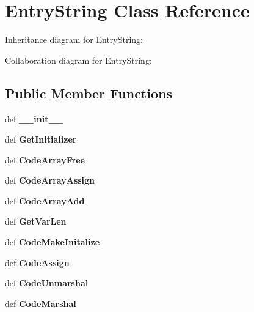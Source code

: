 \section{\-Entry\-String \-Class \-Reference}
\label{classevent__rpcgen_1_1_entry_string}


\-Inheritance diagram for \-Entry\-String\-:


\-Collaboration diagram for \-Entry\-String\-:
\subsection*{\-Public \-Member \-Functions}
\begin{DoxyCompactItemize}
\item 
def {\bfseries \-\_\-\-\_\-init\-\_\-\-\_\-}\label{classevent__rpcgen_1_1_entry_string_ac775ee34451fdfa742b318538164070e}

\item 
def {\bfseries \-Get\-Initializer}\label{classevent__rpcgen_1_1_entry_string_acc967744885bfbdf0f0aeed27c888d23}

\item 
def {\bfseries \-Code\-Array\-Free}\label{classevent__rpcgen_1_1_entry_string_a6041961df8fdc24bd66777ade5b196c5}

\item 
def {\bfseries \-Code\-Array\-Assign}\label{classevent__rpcgen_1_1_entry_string_a4a82db0bf599d23f74a63843f450cea5}

\item 
def {\bfseries \-Code\-Array\-Add}\label{classevent__rpcgen_1_1_entry_string_a1f454357f69d9ec15f1a68c95d0e0326}

\item 
def {\bfseries \-Get\-Var\-Len}\label{classevent__rpcgen_1_1_entry_string_a08d14096a163fb84ee8c3536eab2ff47}

\item 
def {\bfseries \-Code\-Make\-Initalize}\label{classevent__rpcgen_1_1_entry_string_a9a84eb92a91dbaaefcf99c0adea32bfb}

\item 
def {\bfseries \-Code\-Assign}\label{classevent__rpcgen_1_1_entry_string_a6b6a08cd00ffadb276d29fcbf0dc3bfc}

\item 
def {\bfseries \-Code\-Unmarshal}\label{classevent__rpcgen_1_1_entry_string_a4f7edbd130c034cfa9d24b7be679f8af}

\item 
def {\bfseries \-Code\-Marshal}\label{classevent__rpcgen_1_1_entry_string_ae994601ffc7e740cede6cb32d6d4f55a}


\end{DoxyCompactItemize}
